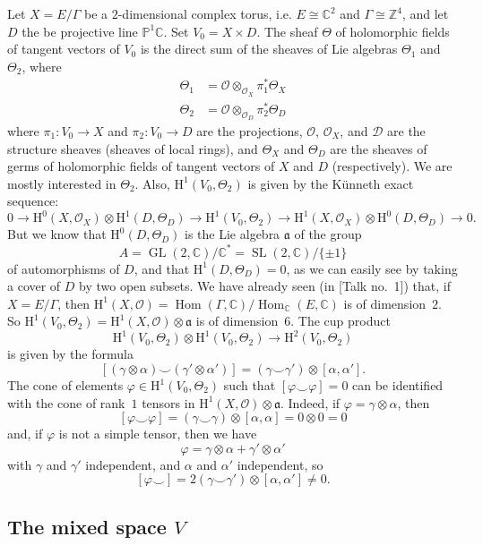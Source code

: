 \documentclass{article}
\renewcommand{\cal}[1]{{\mathcal{#1}}}
\newcommand{\scr}[1]{{\mathscr{#1}}}
\newcommand{\fk}[1]{{\mathfrak{#1}}}
\newcommand{\ZZ}{\mathbb{Z}}
\newcommand{\CC}{\mathbb{C}}
\newcommand{\PP}{\mathbb{P}}
\newcommand{\HH}{\mathrm{H}}
\DeclareMathOperator{\Hom}{Hom}
\DeclareMathOperator{\GL}{GL}
\DeclareMathOperator{\SL}{SL}
\newcommand{\oldpage}[1]{\marginpar{\footnotesize$\Big\vert$ \textit{p.~#1}}}
\begin{document}
Let $X=E/\Gamma$ be a $2$-dimensional complex torus, i.e. $E\cong\CC^2$ and $\Gamma\cong\ZZ^4$, and let $D$ the be projective line $\PP^1\CC$.
Set $V_0=X\times D$.
The sheaf $\Theta$ of holomorphic fields of tangent vectors of $V_0$ is the direct sum of the sheaves of Lie algebras $\Theta_1$ and $\Theta_2$, where
\[
  \begin{aligned}
    \Theta_1 &= \cal{O}\otimes_{\cal{O}_X}\pi_1^*\Theta_X
  \\\Theta_2 &= \cal{O}\otimes_{\cal{O}_D}\pi_2^*\Theta_D
  \end{aligned}
\]
where $\pi_1\colon V_0\to X$ and $\pi_2\colon V_0\to D$ are the projections, $\cal{O}$, $\cal{O}_X$, and $\scr{D}$ are the structure sheaves (sheaves of local rings), and $\Theta_X$ and $\Theta_D$ are the sheaves of germs of holomorphic fields of tangent vectors of $X$ and $D$ (respectively).
We are mostly interested in $\Theta_2$.
Also, $\HH^1(V_0,\Theta_2)$ is given by the K\"{u}nneth exact sequence:
\oldpage{4-06}
\[
  0 \to
  \HH^0(X,\cal{O}_X)\otimes\HH^1(D,\Theta_D) \to
  \HH^1(V_0,\Theta_2) \to
  \HH^1(X,\cal{O}_X)\otimes\HH^0(D,\Theta_D) \to
  0.
\]
But we know that $\HH^0(D,\Theta_D)$ is the Lie algebra $\fk{a}$ of the group
\[
  A = \GL(2,\CC)/\CC^* = \SL(2,\CC)/\{\pm1\}
\]
of automorphisms of $D$, and that $\HH^1(D,\Theta_D)=0$, as we can easily see by taking a cover of $D$ by two open subsets.
We have already seen (in [Talk no.~1]) that, if $X=E/\Gamma$, then $\HH^1(X,\cal{O})=\Hom(\Gamma,\CC)/\Hom_{\CC}(E,\CC)$ is of dimension~$2$.
So $\HH^1(V_0,\Theta_2)=\HH^1(X,\cal{O})\otimes\fk{a}$ is of dimension~$6$.
The cup product
\[
  \HH^1(V_0,\Theta_2)\otimes\HH^1(V_0,\Theta_2) \to \HH^2(V_0,\Theta_2)
\]
is given by the formula
\[
  [(\gamma\otimes\alpha)\smile(\gamma'\otimes\alpha')]
  = (\gamma\smile\gamma')\otimes[\alpha,\alpha'].
\]
The cone of elements $\varphi\in\HH^1(V_0,\Theta_2)$ such that $[\varphi\smile\varphi]=0$ can be identified with the cone of rank~$1$ tensors in $\HH^1(X,\cal{O})\otimes\fk{a}$.
Indeed, if $\varphi=\gamma\otimes\alpha$, then
\[
  [\varphi\smile\varphi]
  = (\gamma\smile\gamma)\otimes[\alpha,\alpha]
  = 0\otimes0
  = 0
\]
and, if $\varphi$ is not a simple tensor, then we have
\[
  \varphi = \gamma\otimes\alpha + \gamma'\otimes\alpha'
\]
with $\gamma$ and $\gamma'$ independent, and $\alpha$ and $\alpha'$ independent, so
\[
  [\varphi\smile] = 2(\gamma\smile\gamma')\otimes[\alpha,\alpha'] \neq 0.
\]


\subsection{The mixed space \texorpdfstring{$V$}{V}}
\label{III.2}
\end{document}
